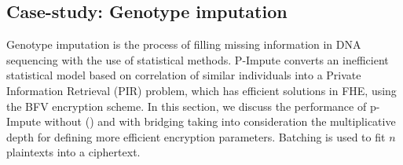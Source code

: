 \subsection{Case-study: Genotype imputation}\label{sss:genotype}

Genotype imputation is the process of filling missing information in DNA sequencing with the use of statistical methods. P-Impute \cite{GURSOY2021} converts an inefficient statistical model based on correlation of similar individuals %
into a Private Information Retrieval (PIR) problem, which has efficient solutions in FHE, using the BFV encryption scheme. In this section, we discuss the performance of p-Impute without (\secuint) and with bridging taking into consideration the multiplicative depth for defining more efficient encryption parameters. Batching is used to fit $n$ plaintexts into a ciphertext.

